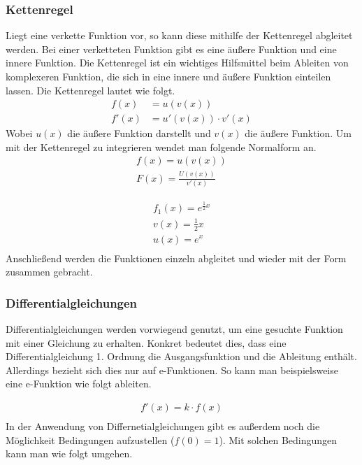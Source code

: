\subsubsection{Kettenregel}
Liegt eine verkette Funktion vor, so kann diese mithilfe der Kettenregel abgleitet werden. Bei einer verketteten Funktion gibt es eine äußere Funktion und eine innere Funktion. 
Die Kettenregel ist ein wichtiges Hilfsmittel beim Ableiten von komplexeren Funktion, die sich in eine innere und äußere Funktion einteilen lassen. Die Kettenregel lautet wie folgt.
\begin{align*}
	f(x)&=u(v(x))\\
	f'(x)&=u'(v(x))\cdot v'(x)
\end{align*}
Wobei $u(x)$ die äußere Funktion darstellt und $v(x)$ die äußere Funktion. 
Um mit der Kettenregel zu integrieren wendet man folgende Normalform an. 
\begin{align*}
	f(x)=u(v(x))\\
	F(x)=\frac{U(v(x))}{v'(x)}
\end{align*}
\begin{beispiel}
	\begin{align*}
		f_1(x)=e^{\frac{1}{2}x}\tag{Aufteilen in innere- und äußere Funktion}\\
		v(x)=\frac{1}{2}x \tag{Die innere Funktion}\\
		u(x)=e^x\tag{Die äußere Funktion}\\
	\end{align*}
	Anschließend werden die Funktionen einzeln abgleitet und wieder mit der Form zusammen gebracht.
\end{beispiel}
\subsubsection{Differentialgleichungen}
Differentialgleichungen werden vorwiegend genutzt, um eine gesuchte Funktion mit einer Gleichung zu erhalten. Konkret bedeutet dies, dass eine Differentialgleichung 1. Ordnung
die Ausgangsfunktion und die Ableitung enthält. Allerdings bezieht sich dies nur auf e-Funktionen. So kann man beispielsweise eine e-Funktion wie folgt ableiten. 

\begin{beispiel}
	\begin{align*}
		f'(x)=k\cdot f(x)\\
	\end{align*}
In der Anwendung von Differnetialgleichungen gibt es außerdem noch die Möglichkeit Bedingungen aufzustellen ($f(0)=1$). Mit solchen Bedingungen kann man wie folgt umgehen.
\end{beispiel}


